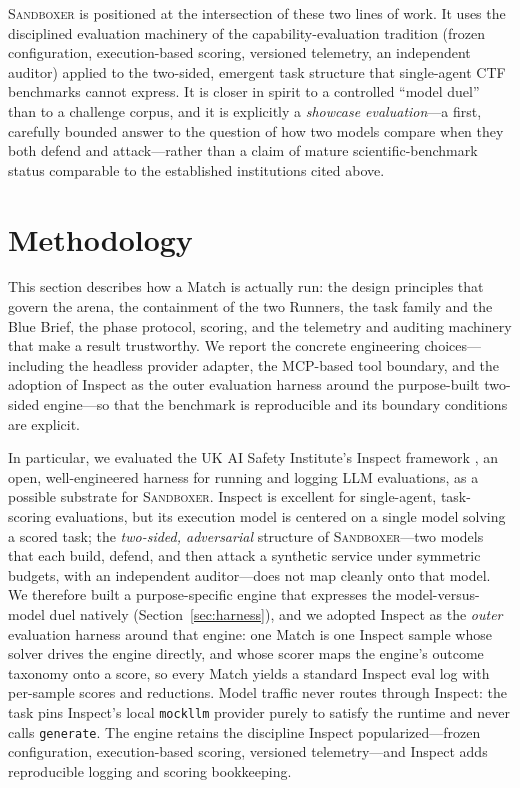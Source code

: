 \documentclass[11pt]{article}
\newcommand{\sandboxer}{\textsc{Sandboxer}}
\begin{document}
\sandboxer{} is positioned at the intersection of these two lines of work. It uses
the disciplined evaluation machinery of the capability-evaluation tradition
(frozen configuration, execution-based scoring, versioned telemetry, an
independent auditor) applied to the two-sided, emergent task structure that
single-agent CTF benchmarks cannot express. It is closer in spirit to a
controlled ``model duel'' than to a challenge corpus, and it is explicitly a
\emph{showcase evaluation}---a first, carefully bounded answer to the question of
how two models compare when they both defend and attack---rather than a claim of
mature scientific-benchmark status comparable to the established institutions
cited above.

\section{Methodology}
\label{sec:methodology}

This section describes how a Match is actually run: the design principles that
govern the arena, the containment of the two Runners, the task family and the
Blue Brief, the phase protocol, scoring, and the telemetry and auditing
machinery that make a result trustworthy. We report the concrete engineering
choices---including the headless provider adapter, the MCP-based tool boundary,
and the adoption of Inspect as the outer evaluation harness around the
purpose-built two-sided engine---so that the benchmark is reproducible and its
boundary conditions are explicit.

In particular, we evaluated the UK AI Safety Institute's Inspect framework
\cite{inspect}, an open, well-engineered harness for running and logging LLM
evaluations, as a possible substrate for \sandboxer{}. Inspect is excellent for
single-agent, task-scoring evaluations, but its execution model is centered on a
single model solving a scored task; the \emph{two-sided, adversarial} structure
of \sandboxer{}---two models that each build, defend, and then attack a
synthetic service under symmetric budgets, with an independent auditor---does
not map cleanly onto that model. We therefore built a purpose-specific engine
that expresses the model-versus-model duel natively
(Section~\ref{sec:harness}), and we adopted Inspect as the \emph{outer}
evaluation harness around that engine: one Match is one Inspect sample whose
solver drives the engine directly, and whose scorer maps the engine's outcome
taxonomy onto a score, so every Match yields a standard Inspect eval log with
per-sample scores and reductions. Model traffic never routes through Inspect:
the task pins Inspect's local \texttt{mockllm} provider purely to satisfy the
runtime and never calls \texttt{generate}. The engine retains the discipline
Inspect popularized---frozen configuration, execution-based scoring, versioned
telemetry---and Inspect adds reproducible logging and scoring bookkeeping.
\end{document}
